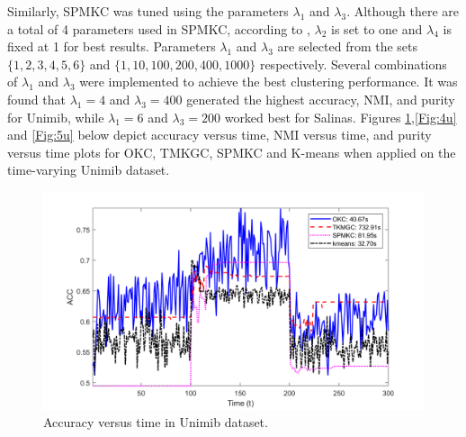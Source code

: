 \documentclass[10pt,final]{IEEEtran}
\begin{document}
Similarly, SPMKC was tuned using the parameters \begin{math}\lambda_1\end{math} and \begin{math}\lambda_3\end{math}. Although there are a total of 4 parameters used in SPMKC, according to \textcolor{black}{\cite{SPMKC}}, \begin{math}\lambda_2\end{math} is set to one and \begin{math}\lambda_4\end{math} is fixed at 1 for best results. Parameters \begin{math}\lambda_1\end{math} and \begin{math}\lambda_3\end{math} are selected from the sets $\{1,2,3,4,5,6\}$ and $\{1,10,100,200,400,1000\}$ respectively. Several combinations of \begin{math}\lambda_1\end{math} and \begin{math}\lambda_3\end{math} were implemented to achieve the best clustering performance. It was found that \begin{math}\lambda_1=4\end{math} and \begin{math}\lambda_3=400\end{math} generated the highest accuracy, NMI, and purity for Unimib, while \begin{math}\lambda_1=6\end{math} and \begin{math}\lambda_3=200\end{math} worked best for Salinas. Figures \ref{Fig:3u},\ref{Fig:4u} and \ref{Fig:5u} below depict accuracy versus time, NMI versus time, and purity versus time plots for OKC, TMKGC, SPMKC and K-means when applied on the time-varying Unimib dataset.
\begin{figure}[htp]
    \centering
    \includegraphics[scale=0.19]{avg_combined_ACC_plots_Unimib.png}
    \caption{Accuracy versus time in Unimib dataset.}
    \label{Fig:3u}
\end{figure}
\end{document}

